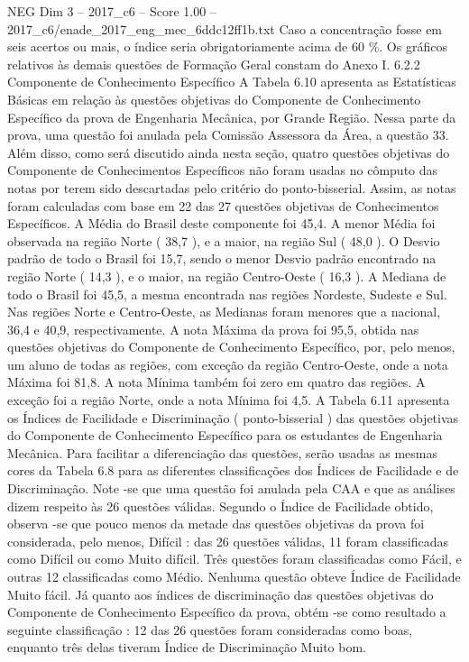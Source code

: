 \begin{textsample}{NEG Dim 3 – 2017\_c6 – Score 1.00 – 2017\_c6/enade\_2017\_eng\_mec\_6ddc12ff1b.txt}
Caso a concentração fosse em seis acertos ou mais, o índice seria obrigatoriamente acima de 60 \%.
Os gráficos relativos às demais questões de Formação Geral constam do Anexo I. 6.2.2 Componente de Conhecimento Específico A Tabela 6.10 apresenta as Estatísticas Básicas em relação às questões objetivas do Componente de Conhecimento Específico da prova de Engenharia Mecânica, por Grande Região.
Nessa parte da prova, uma questão foi anulada pela Comissão Assessora da Área, a questão 33.
Além disso, como será discutido ainda nesta seção, quatro questões objetivas do Componente de Conhecimentos Específicos não foram usadas no cômputo das notas por terem sido descartadas pelo critério do ponto-bisserial.
Assim, as notas foram calculadas com base em 22 das 27 questões objetivas de Conhecimentos Específicos.
A Média do Brasil deste componente foi 45,4.
A menor Média foi observada na região Norte ( 38,7 ), e a maior, na região Sul ( 48,0 ).
O Desvio padrão de todo o Brasil foi 15,7, sendo o menor Desvio padrão encontrado na região Norte ( 14,3 ), e o maior, na região Centro-Oeste ( 16,3 ).
A Mediana de todo o Brasil foi 45,5, a mesma encontrada nas regiões Nordeste, Sudeste e Sul.
Nas regiões Norte e Centro-Oeste, as Medianas foram menores que a nacional, 36,4 e 40,9, respectivamente.
A nota Máxima da prova foi 95,5, obtida nas questões objetivas do Componente de Conhecimento Específico, por, pelo menos, um aluno de todas as regiões, com exceção da região Centro-Oeste, onde a nota Máxima foi 81,8.
A nota Mínima também foi zero em quatro das regiões.
A exceção foi a região Norte, onde a nota Mínima foi 4,5.
A Tabela 6.11 apresenta os Índices de Facilidade e Discriminação ( ponto-bisserial ) das questões objetivas do Componente de Conhecimento Específico para os estudantes de Engenharia Mecânica.
Para facilitar a diferenciação das questões, serão usadas as mesmas cores da Tabela 6.8 para as diferentes classificações dos Índices de Facilidade e de Discriminação.
Note -se que uma questão foi anulada pela CAA e que as análises dizem respeito às 26 questões válidas.
Segundo o Índice de Facilidade obtido, observa -se que pouco menos da metade das questões objetivas da prova foi considerada, pelo menos, Difícil : das 26 questões válidas, 11 foram classificadas como Difícil ou como Muito difícil.
Três questões foram classificadas como Fácil, e outras 12 classificadas como Médio.
Nenhuma questão obteve Índice de Facilidade Muito fácil.
Já quanto aos índices de discriminação das questões objetivas do Componente de Conhecimento Específico da prova, obtém -se como resultado a seguinte classificação : 12 das 26 questões foram consideradas como boas, enquanto três delas tiveram Índice de Discriminação Muito bom.

\end{textsample}
